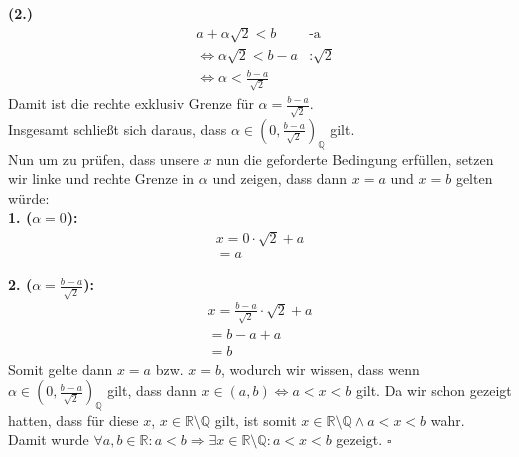 \documentclass[12pt, a4paper]{article}
\newcommand*{\qed}{\null\nobreak\hfill\ensuremath{\square}}
\begin{document}
\textbf{(2.)}
\vspace{-1cm}
\begin{align*}
	& a + \alpha \sqrt{2} < b & \text{-a}\\
	& \Longleftrightarrow \alpha \sqrt{2} < b - a & \text{:$\sqrt{2}$}\\
	& \Longleftrightarrow \alpha < \frac{b - a}{\sqrt{2}}
\end{align*}
\hspace{-0.15cm}
Damit ist die rechte exklusiv Grenze für $\alpha = \frac{b - a}{\sqrt{2}}$.\\
Insgesamt schließt sich daraus, dass $\alpha \in (0,\frac{b - a}{\sqrt{2}})_{\mathbb Q}$ gilt.\\
Nun um zu prüfen, dass unsere $x$ nun die geforderte Bedingung erfüllen, setzen wir linke und rechte Grenze in $\alpha$ und zeigen, dass dann $x = a$ und $x = b$ gelten würde:\\
\textbf{1. ($\alpha = 0$):}
\vspace{-1cm}
\begin{align*}
	& x = 0 \cdot \sqrt{2} + a &\\
	& = a &
\end{align*}

\hspace{-0.75cm}
\textbf{2. ($\alpha = \frac{b - a}{\sqrt{2}}$):}
\vspace{-1cm}
\begin{align*}
	& x = \frac{b - a}{\sqrt{2}} \cdot \sqrt{2} + a & \\
	& = b - a + a & \\
	& = b &
\end{align*}
\hspace{-0.15cm}
Somit gelte dann $x = a$ bzw. $x = b$, wodurch wir wissen, dass wenn $\alpha \in (0,\frac{b - a}{\sqrt{2}})_{\mathbb Q}$ gilt, dass dann $x \in (a,b) \Longleftrightarrow a < x < b$ gilt.
Da wir schon gezeigt hatten, dass für diese $x$, $x \in \mathbb R \setminus \mathbb Q$ gilt, ist somit $x \in \mathbb R \setminus \mathbb Q \wedge a < x < b$ wahr. \\
Damit wurde $\forall a,b \in \mathbb R: a < b \Rightarrow \exists x \in \mathbb R \setminus \mathbb Q : a < x < b$ gezeigt. \qed
\end{document}
